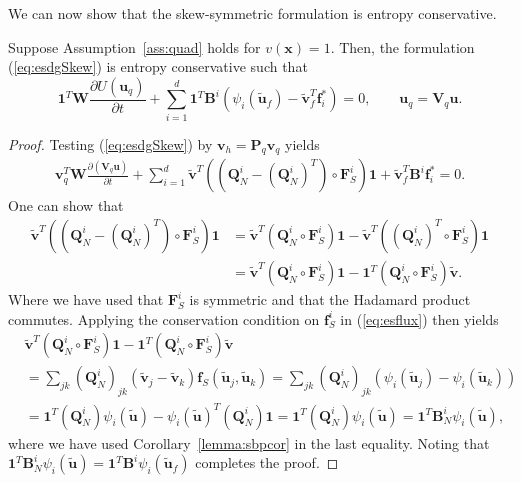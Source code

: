 \documentclass[review]{siamart0216}
\theoremstyle{assumption}
\newcommand{\pd}[2]{\frac{\partial#1}{\partial#2}}
\newcommand{\LRp}[1]{\left( #1 \right)}
\begin{document}
We can now show that the skew-symmetric formulation is entropy conservative.  
\begin{theorem}
Suppose Assumption~\ref{ass:quad} holds for $v(\bm{x}) = 1$.  
Then, the formulation (\ref{eq:esdgSkew}) is entropy conservative such that
\begin{equation}
\bm{1}^T\bm{W}\pd{U(\bm{u}_q)}{t} + \sum_{i=1}^d\bm{1}^T\bm{B}^i \LRp{\psi_i(\tilde{\bm{u}}_f) - \tilde{\bm{v}}_f^T\bm{f}_i^*} = 0, \qquad \bm{u}_q = \bm{V}_q\bm{u}.
\label{eq:esdgthm}
\end{equation}
\label{thm:esdg}
\end{theorem}
\begin{proof}
Testing (\ref{eq:esdgSkew}) by $\bm{v}_h = \bm{P}_q\bm{v}_q$ yields 
\begin{align}
\bm{v}_q^T\bm{W}\pd{\LRp{\bm{V}_q\bm{u}}}{t} + \sum_{i=1}^d
\tilde{\bm{v}}^T \LRp{\LRp{\bm{Q}^i_N - \LRp{\bm{Q}^i_N}^T} \circ \bm{F}^i_S}\bm{1} + \tilde{\bm{v}}_f^T \bm{B}^i\bm{f}_i^* = 0.
\end{align}
One can show that \cite{chan2017discretely}
\begin{align*}
\tilde{\bm{v}}^T \LRp{\LRp{\bm{Q}^i_N - \LRp{\bm{Q}^i_N}^T} \circ \bm{F}^i_S}\bm{1} &= \tilde{\bm{v}}^T \LRp{\bm{Q}^i_N \circ \bm{F}^i_S}\bm{1} - \tilde{\bm{v}}^T \LRp{\LRp{\bm{Q}^i_N}^T \circ \bm{F}^i_S}\bm{1}\\
&= \tilde{\bm{v}}^T \LRp{\bm{Q}^i_N \circ \bm{F}^i_S}\bm{1} - \bm{1}^T \LRp{{\bm{Q}^i_N} \circ \bm{F}^i_S}\tilde{\bm{v}}.
\end{align*}
Where we have used that $\bm{F}^i_S$ is symmetric and that the Hadamard product commutes.  Applying the conservation condition on $\bm{f}^i_S$ in (\ref{eq:esflux}) then yields
\begin{align*}
&\tilde{\bm{v}}^T \LRp{\bm{Q}^i_N \circ \bm{F}^i_S}\bm{1} - \bm{1}^T \LRp{{\bm{Q}^i_N} \circ \bm{F}^i_S}\tilde{\bm{v}} \\
&= \sum_{jk} \LRp{\bm{Q}^i_N}_{jk} \LRp{\tilde{\bm{v}}_j-\tilde{\bm{v}}_k} \bm{f}_S\LRp{\tilde{\bm{u}}_j,\tilde{\bm{u}}_k} = \sum_{jk} \LRp{\bm{Q}^i_N}_{jk} \LRp{\psi_i(\tilde{\bm{u}}_j) - \psi_i(\tilde{\bm{u}}_k)}\\
&= \bm{1}^T\LRp{\bm{Q}^i_N}\psi_i(\tilde{\bm{u}}) - \psi_i(\tilde{\bm{u}})^T\LRp{\bm{Q}^i_N}\bm{1} = \bm{1}^T\LRp{\bm{Q}^i_N}\psi_i(\tilde{\bm{u}}) = \bm{1}^T\bm{B}^i_N\psi_i(\tilde{\bm{u}}),
\end{align*}
where we have used Corollary~\ref{lemma:sbpcor} in the last equality.  Noting that $\bm{1}^T\bm{B}^i_N\psi_i(\tilde{\bm{u}}) = \bm{1}^T\bm{B}^i \psi_i(\tilde{\bm{u}}_f)$ completes the proof.
\end{proof}
\end{document}
